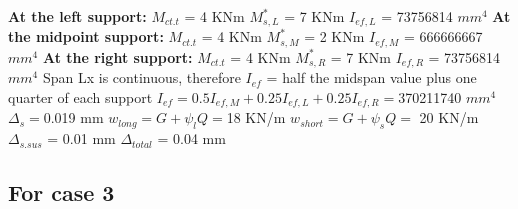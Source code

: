 \documentclass{article}%
\begin{document}
%
\newline%
\newline%
%
\textbf{At the left support:}%
\newline%
\newline%
%
$M_{ct.t}$ = 4 KNm%
\newline%
%
$M_{s,L}^{*}$ = 7 KNm%
\newline%
%
$I_{ef,L}$ = 73756814 $mm^{4}$%
\newline%
\newline%
%
\textbf{At the midpoint support:}%
\newline%
\newline%
%
$M_{ct.t}$ = 4 KNm%
\newline%
%
$M_{s,M}^{*}$ = 2 KNm%
\newline%
%
$I_{ef,M}$ = 666666667 $mm^{4}$%
\newline%
\newline%
%
\textbf{At the right support:}%
\newline%
\newline%
%
$M_{ct.t}$ = 4 KNm%
\newline%
%
$M_{s,R}^{*}$ = 7 KNm%
\newline%
%
$I_{ef,R}$ = 73756814 $mm^{4}$%
\newline%
\newline%
%
Span Lx is continuous, therefore $I_{ef}$ = half the midspan value plus one quarter of each support%
\newline%
\newline%
%
$I_{ef} = 0.5I_{ef,M} + 0.25I_{ef,L} + 0.25I_{ef,R} = $370211740 $ mm^{4}$%
\newline%
\newline%
%
$\Delta_{s} =$0.019 mm%
\newline%
\newline%
%
$w_{long} = G + \psi_{l}Q = $18 KN/m%
\newline%
%
$w_{short} = G + \psi_{s}Q = $ 20 KN/m%
\newline%
\newline%
%
$\Delta_{s.sus}$ = 0.01 mm%
\newline%
\newline%
%
$\Delta_{total}$ = 0.04 mm%
\subsection*{For case 3}%
\label{subsec:Forcase3}%
\end{document}
